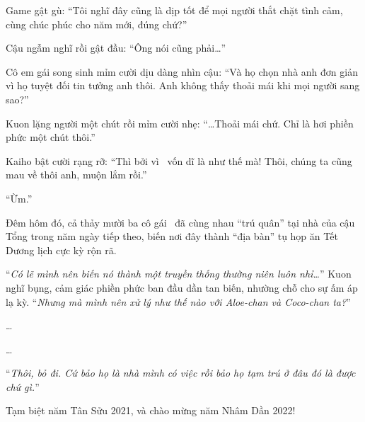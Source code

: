 \documentclass[../main.tex]{subfiles}
\begin{document}
Game gật gù: ``Tôi nghĩ đây cũng là dịp tốt để mọi người thắt chặt tình cảm, cùng chúc phúc cho năm mới, đúng chứ?''

Cậu ngẫm nghĩ rồi gật đầu: ``Ông nói cũng phải\dots''

Cô em gái song sinh mỉm cười dịu dàng nhìn cậu: ``Và họ chọn nhà anh đơn giản vì họ tuyệt đối tin tưởng anh thôi. Anh không thấy thoải mái khi mọi người sang sao?''

Kuon lặng người một chút rồi mỉm cười nhẹ: ``\dots Thoải mái chứ. Chỉ là hơi phiền phức một chút thôi.''

Kaiho bật cười rạng rỡ: ``Thì bởi vì \hll\ vốn dĩ là như thế mà! Thôi, chúng ta cũng mau về thôi anh, muộn lắm rồi.''

``Ừm.''

Đêm hôm đó, cả thảy mười ba cô gái \hll\ đã cùng nhau ``trú quân'' tại nhà của cậu Tổng trong năm ngày tiếp theo, biến nơi đây thành ``địa bàn'' tụ họp ăn Tết Dương lịch cực kỳ rộn rã.

``\textit{Có lẽ mình nên biến nó thành một truyền thống thường niên luôn nhỉ\dots}'' Kuon nghĩ bụng, cảm giác phiền phức ban đầu dần tan biến, nhường chỗ cho sự ấm áp lạ kỳ. ``\textit{Nhưng mà mình nên xử lý như thế nào với Aloe-chan và Coco-chan ta?}''

\dots

\dots

``\textit{Thôi, bỏ đi. Cứ bảo họ là nhà mình có việc rồi bảo họ tạm trú ở đâu đó là được chứ gì.}''

Tạm biệt năm Tân Sửu 2021, và chào mừng năm Nhâm Dần 2022!
\end{document}

